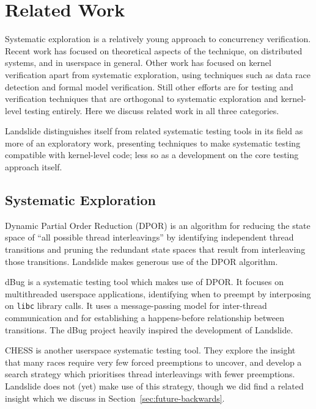 \chapter{Related Work}


Systematic exploration is a relatively young approach to concurrency verification.
Recent work has focused on theoretical aspects of the technique, on distributed systems, and in userspace in general.
Other work has focused on kernel verification apart from systematic exploration, using techniques such as data race detection and formal model verification.
Still other efforts are for testing and verification techniques that are orthogonal to systematic exploration and kernel-level testing entirely.
Here we discuss related work in all three categories.

Landslide distinguishes itself from related systematic testing tools in its field as more of an exploratory work, presenting techniques to make systematic testing compatible with kernel-level code; less so as a development on the core testing approach itself.

\section{Systematic Exploration}

Dynamic Partial Order Reduction (DPOR)\hspace{0in}\cite{dpor,sdpor,dbug-retreat,distributed-dpor} is an algorithm for reducing the state space of ``all possible thread interleavings'' by identifying independent thread transitions and pruning the redundant state spaces that result from interleaving those transitions. Landslide makes generous use of the DPOR algorithm.

dBug\cite{dbug-ssv} is a systematic testing tool which makes use of DPOR. It focuses on multithreaded userspace applications, identifying when to preempt by interposing on \texttt{libc} library calls. It uses a message-passing model for inter-thread communication and for establishing a happens-before relationship between transitions. The dBug project heavily inspired the development of Landslide.

CHESS\cite{chess} is another userspace systematic testing tool. They explore the insight that many races require very few forced preemptions to uncover, and develop a search strategy which prioritises thread interleavings with fewer preemptions. Landslide does not (yet) make use of this strategy, though we did find a related insight which we discuss in Section~\ref{sec:future-backwards}.


